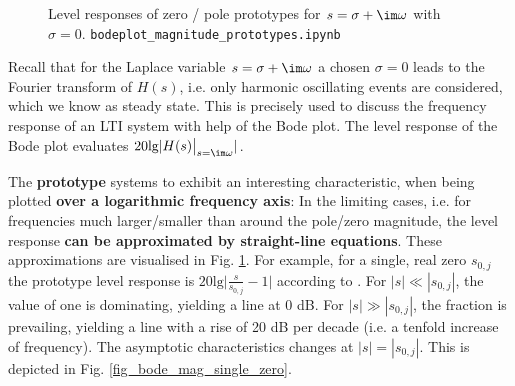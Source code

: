 \begin{figure}[!ht]
\caption{Level responses of zero / pole prototypes for $s = \sigma + \im \omega$ with $\sigma=0$.
\texttt{bodeplot\_magnitude\_prototypes.ipynb}}
\label{fig:magbodeprototype}
\end{figure}

Recall that for the Laplace variable $s=\sigma + \im\omega$ a chosen  $\sigma=0$
leads to the Fourier transform of $H(s)$, i.e. only harmonic oscillating events
are considered, which we know as steady state.
This is precisely used to discuss the frequency response of an LTI system with
help of the Bode plot.
The level response of the Bode plot evaluates $20 \text{lg} |H(s)\big|_{s=\im \omega}|$.

The \textbf{prototype} systems  to
 exhibit an interesting characteristic,
when being plotted \textbf{over a logarithmic frequency axis}:
In the limiting cases, i.e. for frequencies much larger/smaller than around the pole/zero magnitude, the level response \textbf{can be approximated by straight-line equations}.
These approximations are visualised in Fig. \ref{fig:magbodeprototype}.
For example, for a single, real zero $s_{0,j}$ the prototype level response is $20 \text{lg}  \bigg|\frac{s}{s_{0,j}}-1\bigg|$
according to .
For $|s| \ll |s_{0,j}|$, the value of one is dominating, yielding a line at 0 dB.
For $|s| \gg |s_{0,j}|$, the fraction is prevailing, yielding a line with a rise of 20 dB per decade (i.e. a tenfold increase of frequency).
The asymptotic characteristics changes at $|s| = |s_{0,j}|$.
This is depicted in Fig. \ref{fig_bode_mag_single_zero}.



